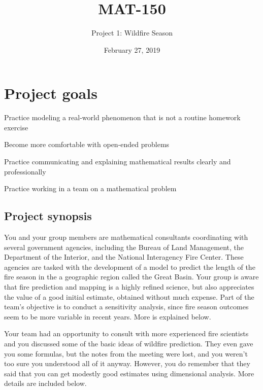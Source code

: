 \documentclass[11pt]{article}\usepackage[]{graphicx}\usepackage[]{color}
\title{MAT-150}
\author{Project 1: Wildfire Season}
\date{February 27, 2019}
\begin{document}

\thispagestyle{empty}
\maketitle
\thispagestyle{empty} \pagestyle{empty}








\section*{Project goals}
\begin{compactitem}
    \item Practice modeling a real-world phenomenon that is not a routine
        homework exercise
    \item Become more comfortable with open-ended problems
    \item Practice communicating and explaining mathematical results clearly    and professionally
    \item Practice working in a team on a mathematical problem
\end{compactitem}


\subsection*{Project synopsis}

    You and your group members are mathematical consultants coordinating with
    several government agencies, including the Bureau of Land Management, the
    Department of the Interior, and the National Interagency Fire Center.
    These agencies are tasked with the development of a model to predict the
    length of the fire season in the a geographic region called the Great
    Basin. Your group is aware that fire prediction and mapping is a highly
    refined science, but also appreciates the value of a good initial
    estimate, obtained without much expense. Part of the team's objective is
    to conduct a sensitivity analysis, since fire season outcomes seem to be
    more variable in recent years. More is explained below.

    Your team had an opportunity to consult with more experienced
    fire scientists and you discussed some of the basic ideas of wildfire
    prediction. They even gave you some formulas, but the notes from the
    meeting were lost, and you weren't too sure you understood all of it
    anyway. However, you do remember that they said that you can get
    modestly good estimates using dimensional analysis. More details are
    included below.
\end{document}
